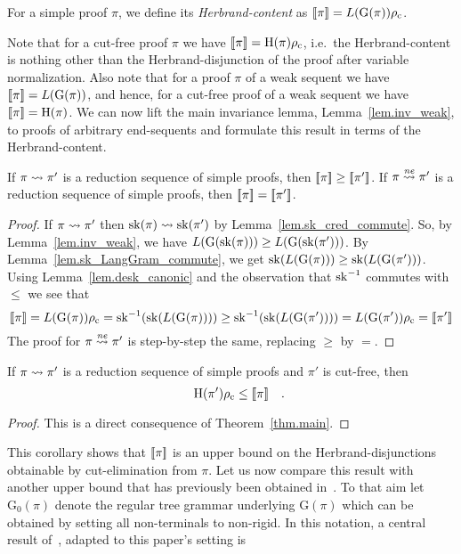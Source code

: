 \documentclass{LMCS}
\theoremstyle{plain}
\theoremstyle{definition}
\def\quadfs {\rlap{\rm\quad.}}\def\quadcm {\rlap{\rm\quad,}}\def\quadsc {\rlap{\rm\quad;}}\def\quadcl {\rlap{\rm\quad:}}\def\quadqm {\rlap{\rm\quad?}}
\newcommand{\Lang}[1]{L(#1)}	\newcommand{\Gram}[1]{\mathrm{G}(#1)}	\newcommand{\Gramreg}[1]{\mathrm{G}_0(#1)}
\newcommand{\Hcont}[1]{[\mkern-3mu[#1]\mkern-3mu]}
\newcommand{\Hsub}{\le}
\newcommand{\Hsup}{\ge}
\begin{document}
\begin{defi}
For a simple proof $\pi$, we define its
\emph{Herbrand-content} as $\Hcont{\pi} = \Lang{\Gram{\pi}}\rho_\mathrm{c}$.
\end{defi}

Note that for a cut-free proof $\pi$ we have $\Hcont{\pi} =
\Hseq(\pi)\rho_\mathrm{c}$, i.e.\ the Herbrand-content is nothing other than
the Herbrand-disjunction of the proof after variable
normalization. Also note that for a proof $\pi$ of a weak sequent we
have $\Hcont{\pi} = \Lang{\Gram{\pi}}$, and hence, for a cut-free proof
of a weak sequent we have $\Hcont{\pi} = \Hseq(\pi)$. We can now lift the
main invariance lemma, Lemma~\ref{lem.inv_weak}, to proofs of
arbitrary end-sequents and formulate this result in terms of the
Herbrand-content.

\begin{theorem}\label{thm.main}
If $\pi\rightsquigarrow \pi'$ is a reduction sequence of simple proofs, then
$\Hcont{\pi}\Hsup \Hcont{\pi'}$.
If $\pi\stackrel{\mathit{ne}}{\rightsquigarrow} \pi'$ is a reduction sequence of simple proofs,
then $\Hcont{\pi}=\Hcont{\pi'}$.
\end{theorem}

\begin{proof}
If $\pi\rightsquigarrow \pi'$ then $\mathrm{sk}(\pi)\rightsquigarrow \mathrm{sk}(\pi')$ by Lemma~\ref{lem.sk_cred_commute}.
So, by Lemma~\ref{lem.inv_weak}, we have $\Lang{\Gram{\sk(\pi)}} \Hsup \Lang{\Gram{\sk(\pi')}}$.
By Lemma~\ref{lem.sk_LangGram_commute}, we get
$\sk(\Lang{\Gram{\pi}}) \Hsup \sk(\Lang{\Gram{\pi'}})$. Using
Lemma~\ref{lem.desk_canonic} and the observation that $\mathrm{sk}^{-1}$ commutes with $\Hsub$
we see that
\[
\Hcont{\pi} = \Lang{\Gram{\pi}}\rho_\mathrm{c} = \sk^{-1}(\sk(\Lang{\Gram{\pi}})) \Hsup
\sk^{-1}(\sk(\Lang{\Gram{\pi'}})) = \Lang{\Gram{\pi'}}\rho_\mathrm{c} = \Hcont{\pi'}
\]
The proof for $\pi\stackrel{\mathit{ne}}{\rightsquigarrow}\pi'$ is step-by-step the same, replacing $\Hsup$
by $=$.
\end{proof}

\begin{cOr}\label{cor.upperbound}
If $\pi\rightsquigarrow\pi'$ is a reduction sequence of simple proofs and
$\pi'$ is cut-free, then $$\Hseq(\pi')\rho_\mathrm{c}\Hsub \Hcont{\pi}\quadfs$$
\end{cOr}
\begin{proof}
This is a direct consequence of Theorem~\ref{thm.main}.
\end{proof}

This corollary shows that $\Hcont{\pi}$ is an upper bound on the Herbrand-disjunctions obtainable by
cut-elimination from $\pi$. Let us now compare this result with
another upper bound that has previously been obtained
in~\cite{Hetzl10Form}. To that aim let $\Gramreg{\pi}$ denote the
regular tree grammar underlying $\Gram{\pi}$ which can be obtained by
setting all non-terminals to non-rigid. In this notation, a central
result of~\cite{Hetzl10Form}, adapted to this paper's setting is
\end{document}
